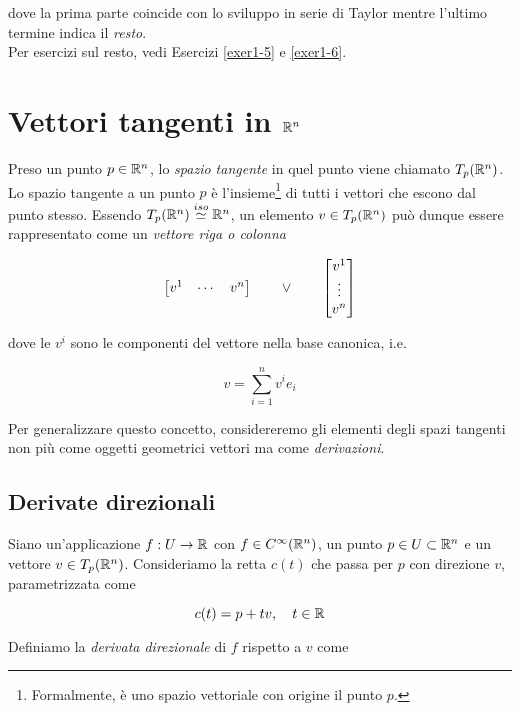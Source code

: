 dove la prima parte coincide con lo sviluppo in serie di Taylor mentre l'ultimo termine indica il \textit{resto}. \\
Per esercizi sul resto, vedi Esercizi \ref{exer1-5} e \ref{exer1-6}.

\section{Vettori tangenti in $ \mathbb{R}^{n} $}

Preso un punto $ p \in \mathbb{R}^{n} $, lo \textit{spazio tangente} in quel punto viene chiamato $ T_{p}(\mathbb{R}^{n}) $. Lo spazio tangente a un punto $ p $ è l'insieme\footnote{%
	Formalmente, è uno spazio vettoriale con origine il punto $ p $.%
} di tutti i vettori che escono dal punto stesso. Essendo $ T_{p}(\mathbb{R}^{n}) \stackrel{iso}{\simeq} \mathbb{R}^{n} $, un elemento $ v \in T_{p}(\mathbb{R}^{n}) $ può dunque essere rappresentato come un \textit{vettore riga o colonna}

\begin{equation}
	\bmqty{ v^{1} & \cdots & v^{n} } \qquad \lor \qquad \bmqty{ v^{1} \\ \vdots \\ v^{n} }
\end{equation}

dove le $ v^{i} $ sono le componenti del vettore nella base canonica, i.e.

\begin{equation}
	v = \sum_{i=1}^{n} v^{i} e_{i}
\end{equation}

Per generalizzare questo concetto, considereremo gli elementi degli spazi tangenti non più come oggetti geometrici vettori ma come \textit{derivazioni}.

\subsection{Derivate direzionali}

Siano un'applicazione $ f : U \to \mathbb{R} $ con $ f \in C^{\infty}(\mathbb{R}^{n}) $, un punto $ p\in U \subset \mathbb{R}^{n} $ e un vettore $ v \in T_{p}(\mathbb{R}^{n}) $. Consideriamo la retta $ c(t) $ che passa per $ p $ con direzione $ v $, parametrizzata come

\begin{equation}
	c(t) = p + t v \qcomma t \in \R
\end{equation}

Definiamo la \textit{derivata direzionale} di $ f $ rispetto a $ v $ come

